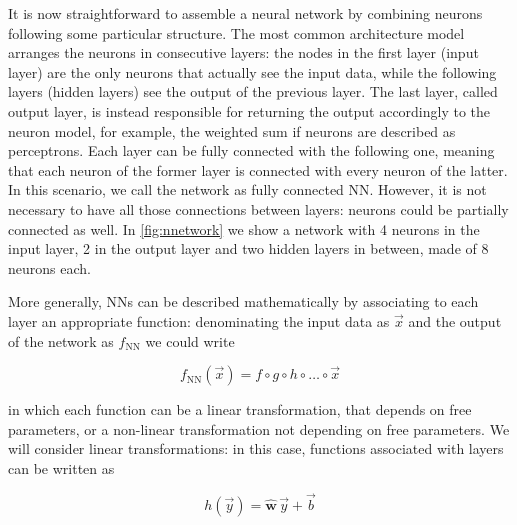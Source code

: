 \begin{figure}[H]
	\centering
	
	\label{fig:perceptron}
\end{figure}  

It is now straightforward to assemble a neural network by combining neurons following some particular structure. The
most common architecture model arranges the neurons in consecutive layers: the nodes in the first layer (input layer)
are the only neurons that actually see the input data, while the following layers (hidden layers) see the output of
the previous layer. The last layer, called output layer, is instead responsible for returning the output accordingly to
the neuron model, for example, the weighted sum if neurons are described as perceptrons. Each layer can be fully
connected with the following one, meaning that each neuron of the former layer is connected with every neuron of the
latter. In this scenario, we call the network as fully connected NN. However, it is not necessary to have all those
connections between layers: neurons could be partially connected as well. In \autoref{fig:nnetwork} we show a network
with 4 neurons in the input layer, 2 in the output layer and two hidden layers in between, made of 8 neurons each. 

\begin{figure}[H]
	\centering
	
	\label{fig:nnetwork}
\end{figure}  

More generally, NNs can be described mathematically by associating to each layer an appropriate function: denominating
the input data as $\vec{x}$ and the output of the network as $f_{\text{NN}}$ we could write 

\begin{equation}
    f_{\text{NN}}(\vec{x})= f \circ g \circ h \circ \ldots \circ \vec{x}
\end{equation}

\noindent in which each function can be a linear transformation, that depends on free parameters, or a non-linear
transformation not depending on free parameters. We will consider linear transformations: in this case, functions
associated with layers can be written as 

\begin{equation}
    h(\vec{y})=\hat{\mathbf{w}}\,\vec{y} + \vec{b}
\end{equation}

